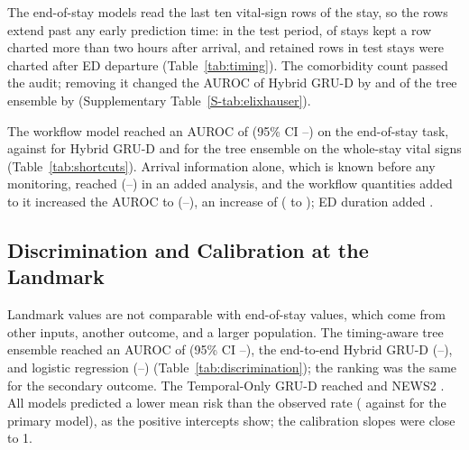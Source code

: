 The end-of-stay models read the last ten vital-sign rows of the stay, so the rows extend past any early prediction time: in the test period,
\RVAfterTwoHTest{} of stays kept a row charted more than two hours after arrival, and \RVAfterDepRowsTest{} retained rows in \RVAfterDepStaysTest{} test stays were charted after ED departure (Table~\ref{tab:timing}). The comorbidity count passed the audit; removing it changed the AUROC of Hybrid GRU-D by \RVElixDeltaHybrid{} and of the tree ensemble by \RVElixDeltaXgb{}
(Supplementary Table~\ref{S-tab:elixhauser}).

The workflow model reached an AUROC of \RVShortAAuroc{} (95\% CI
\RVShortALo{}--\RVShortAHi{}) on the end-of-stay task, against
\RVEosHybridAuroc{} for Hybrid GRU-D and \RVEosXgbAuroc{} for the tree ensemble on the whole-stay vital signs (Table~\ref{tab:shortcuts}). Arrival information alone, which is known before any monitoring, reached \RVIncArr{} (\RVIncArrLo{}--\RVIncArrHi{}) in an added analysis, and the workflow quantities added to it increased the AUROC to \RVIncArrWork{} (\RVIncArrWorkLo{}--\RVIncArrWorkHi{}), an increase of \RVIncWorkOverArr{} (\RVIncWorkOverArrLo{} to \RVIncWorkOverArrHi{}); ED duration added \RVIncDurOverArr{}.



\subsection{Discrimination and Calibration at the Landmark}
\label{sec:results-discrimination}

Landmark values are not comparable with end-of-stay values, which come from other inputs, another outcome, and a larger population. The timing-aware tree ensemble
reached an AUROC of \RVAurocXgbT{} (95\% CI \RVLoXgbT{}--\RVHiXgbT{}), the end-to-end Hybrid GRU-D \RVAurocEndToEnd{} (\RVLoEndToEnd{}--\RVHiEndToEnd{}), and logistic
regression \RVAurocLr{} (\RVLoLr{}--\RVHiLr{}) (Table~\ref{tab:discrimination}); the ranking was the same for the secondary outcome. The Temporal-Only GRU-D reached
\RVAurocTmp{} and NEWS2 \RVNewsHtwo{}.
All models predicted a lower mean risk than the observed rate (\RVCalMeanPredEndToEnd{} against \RVCalObserved{} for the primary model), as the positive intercepts show; the calibration slopes were close to 1.

